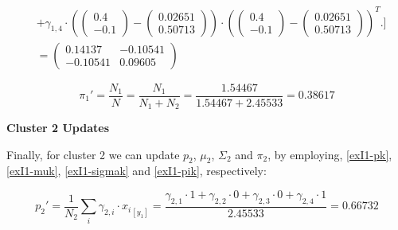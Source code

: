 \documentclass[12pt]{article}
\begin{document}
\begin{enumerate}[leftmargin=\labelsep]
\begin{align*}
                        & + \gamma_{1,4} \cdot \left(\begin{pmatrix} 0.4 \\ -0.1 \end{pmatrix} - \begin{pmatrix} 0.02651 \\ 0.50713 \end{pmatrix}\right) \cdot \left(\begin{pmatrix} 0.4 \\ -0.1 \end{pmatrix} - \begin{pmatrix} 0.02651 \\ 0.50713 \end{pmatrix}\right)^T
                        \Bigg. \Bigg] \\
                        & = \begin{pmatrix} 0.14137 & -0.10541 \\ -0.10541 & 0.09605 \end{pmatrix}
          \end{align*}
          \endgroup

          \begin{equation*}
              \pi_1' = \frac{N_1}{N} = \frac{N_1}{N_1 + N_2} = \frac{1.54467}{1.54467 + 2.45533} = 0.38617
          \end{equation*}

          \begin{center}
              \textbf{\colorbox{byellow}{Cluster 2 Updates}}
          \end{center}

          Finally, for cluster 2 we can update $p_2$, $\mu_2$, $\Sigma_2$ and $\pi_2$, by employing, \eqref{exI1-pk}, \eqref{exI1-muk},
          \eqref{exI1-sigmak} and \eqref{exI1-pik}, respectively:

          \begingroup
          \allowdisplaybreaks
          \begin{equation*}
              p_2' = \frac{1}{N_2} \sum_{i} \gamma_{2,i} \cdot {x_i}_{[y_1]}
                   = \frac{\gamma_{2,1} \cdot 1
                          + \gamma_{2,2} \cdot 0
                          + \gamma_{2,3} \cdot 0
                          + \gamma_{2,4} \cdot 1}{2.45533}
                   = 0.66732
          \end{equation*}
          \endgroup


\end{enumerate}
\end{document}
